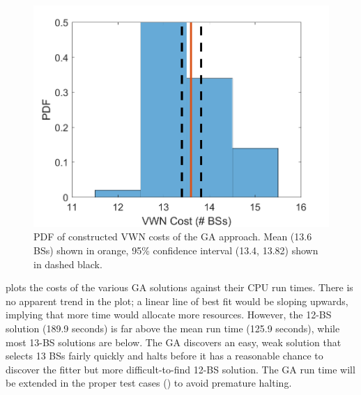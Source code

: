 \documentclass[12pt,dvipsnames]{report}
\begin{document}
\begin{figure}[htp]
	\centering
	\includegraphics[height=0.4\textheight]{Figures/Prelim_GACostsPDF}
	\caption[GA approach VWN cost trend for preliminary simulations]{PDF of constructed VWN costs of the GA approach.  Mean (13.6 BSs) shown in orange, 95\% confidence interval (13.4, 13.82) shown in dashed black.}
	\label{fig:Prelim_GACostsPDF}
\end{figure}

 plots the costs of the various GA solutions against their CPU run times.  There is no apparent trend in the plot; a linear line of best fit would be sloping upwards, implying that more time would allocate more resources.  However, the 12-BS solution (189.9 seconds) is far above the mean run time (125.9 seconds), while most 13-BS solutions are below.  The GA discovers an easy, weak solution that selects 13 BSs fairly quickly and halts before it has a reasonable chance to discover the fitter but more difficult-to-find 12-BS solution.  The GA run time will be extended in the proper test cases () to avoid premature halting.
\end{document}
